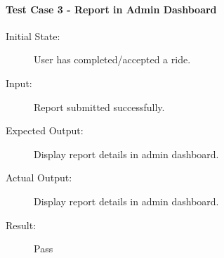 \paragraph{Test Case 3 - Report in Admin Dashboard} \label{test-FR5-3}
\begin{description}
    \item[Initial State:] User has completed/accepted a ride.
    \item[Input:] Report submitted successfully.
    \item[Expected Output:] Display report details in admin dashboard.
    \item[Actual Output:] Display report details in admin dashboard.
    \item[Result:] Pass
\end{description}

